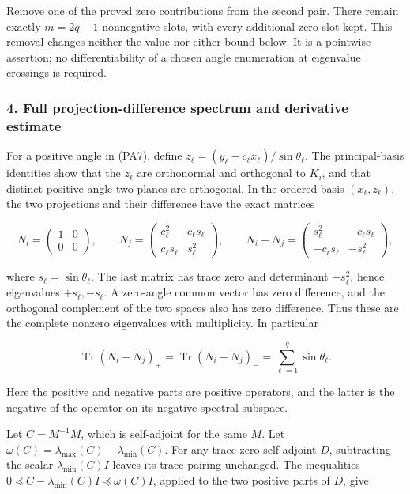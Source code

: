 Remove one of the proved zero contributions from the second pair. There remain exactly \(m=2q-1\) nonnegative slots, with every additional zero slot kept. This removal changes neither the value nor either bound below. It is a pointwise assertion; no differentiability of a chosen angle enumeration at eigenvalue crossings is required.

\subsubsection{4. Full projection-difference spectrum and derivative estimate}\label{endpoint-principal_angle_volume_review--full-projection-difference-spectrum-and-derivative-estimate}

For a positive angle in (PA7), define \(z_\ell=(y_\ell-c_\ell x_\ell)/\sin\theta_\ell\). The principal-basis identities show that the \(z_\ell\) are orthonormal and orthogonal to \(K_i\), and that distinct positive-angle two-planes are orthogonal. In the ordered basis \((x_\ell,z_\ell)\), the two projections and their difference have the exact matrices

\[
N_i=\begin{pmatrix}1&0\\0&0\end{pmatrix},\qquad
N_j=\begin{pmatrix}c_\ell^2&c_\ell s_\ell\\c_\ell s_\ell&s_\ell^2\end{pmatrix},
\qquad
N_i-N_j=
\begin{pmatrix}s_\ell^2&-c_\ell s_\ell\\-c_\ell s_\ell&-s_\ell^2\end{pmatrix},
\tag{PA13}
\]

where \(s_\ell=\sin\theta_\ell\). The last matrix has trace zero and determinant \(-s_\ell^2\), hence eigenvalues \(+s_\ell,-s_\ell\). A zero-angle common vector has zero difference, and the orthogonal complement of the two spaces also has zero difference. Thus these are the complete nonzero eigenvalues with multiplicity. In particular

\[
\operatorname{Tr}(N_i-N_j)_+
=\operatorname{Tr}(N_i-N_j)_-
=\sum_{\ell=1}^q\sin\theta_\ell.
\tag{PA14}
\]

Here the positive and negative parts are positive operators, and the latter is the negative of the operator on its negative spectral subspace.

Let \(C=M^{-1}\dot M\), which is self-adjoint for the same \(M\). Let \(\omega(C)=\lambda_{\max}(C)-\lambda_{\min}(C)\). For any trace-zero self-adjoint \(D\), subtracting the scalar \(\lambda_{\min}(C)I\) leaves its trace pairing unchanged. The inequalities \(0\preceq C-\lambda_{\min}(C)I\preceq\omega(C)I\), applied to the two positive parts of \(D\), give

